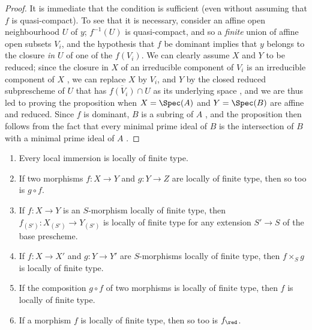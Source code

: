 \begin{proof}
It is immediate that the condition is sufficient (even without assuming that $f$ is quasi-compact).
To see that it is necessary, consider an affine open neighbourhood $U$ of $y$;
$f^{-1}(U)$ is quasi-compact, and so a \emph{finite} union of affine open subsets $V_i$, and the hypothesis that $f$ be dominant implies that $y$ belongs to the closure \emph{in $U$} of one of the $f(V_i)$.
We can clearly assume $X$ and $Y$ to be reduced;
since the closure in $X$ of an irreducible component of $V_i$ is an irreducible component of $X$ , we can replace $X$ by $V_i$, and $Y$ by the closed reduced subprescheme of $U$ that has $\overline{f(V_i)}\cap U$ as its underlying space , and we are thus led to proving the proposition when $X=\Spec(A)$ and $Y=\Spec(B)$ are affine and reduced.
Since $f$ is dominant, $B$ is a subring of $A$ , and the proposition then follows from the fact that every minimal prime ideal of $B$ is the intersection of $B$ with a minimal prime ideal of $A$ .
\end{proof}

\begin{proposition}[6.6.6]
\label{I.6.6.6}
\medskip\noindent
\begin{enumerate}
  \item[{\rm(i)}] Every local immersion is locally of finite type.
  \item[{\rm(ii)}] If two morphisms $f:X\to Y$ and $g:Y\to Z$ are locally of finite type, then so too is $g\circ f$.
  \item[{\rm(iii)}] If $f:X\to Y$ is an $S$-morphism locally of finite type, then $f_{(S')}:X_{(S')}\to Y_{(S')}$ is locally of finite type for any extension $S'\to S$ of the base prescheme.
  \item[{\rm(iv)}] If $f:X\to X'$ and $g:Y\to Y'$ are $S$-morphisms locally of finite type, then $f\times_S g$ is locally of finite type.
  \item[{\rm(v)}] If the composition $g\circ f$ of two morphisms is locally of finite type, then $f$ is locally of finite type.
  \item[{\rm(vi)}] If a morphism $f$ is locally of finite type, then so too is $f_\red$.
\end{enumerate}
\end{proposition}

